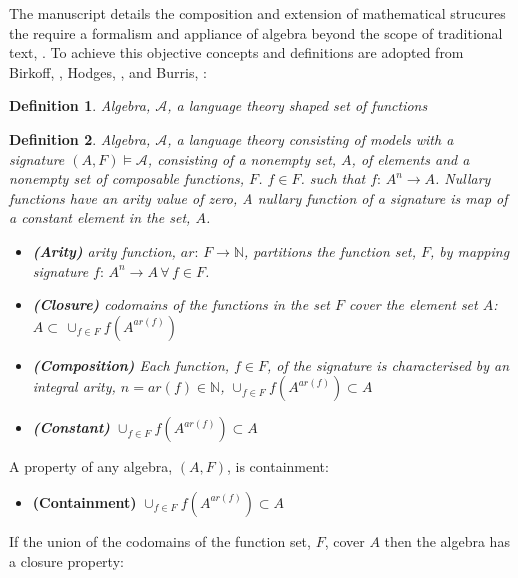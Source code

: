 \documentclass[aps,twocolumn,secnumarabic,nobalancelastpage,amsmath,amssymb,
amsthm,nofootinbib,parskip=full]{revtex4}
\newtheorem{definition}{Definition}[section]
\begin{document}
The manuscript details the composition and extension of
mathematical strucures the require a formalism and appliance
of algebra beyond the scope of traditional text, \cite{hungerford1974}.
To achieve this objective concepts and definitions are
adopted from Birkoff, \cite{birkoff1935}, Hodges, \cite{hodges1993},
and Burris, \cite{burris1981}:

\begin{definition}{Algebra, $\mathcal{A}$}\label{algebradef},
  a language theory shaped set of functions 
\end{definition}

\begin{definition}{Algebra, $\mathcal{A}$}\label{algebradef},
  a language theory consisting of models with
  a signature $(A,F)\models\mathcal{A}$,
  consisting of a nonempty set, $A$, of elements and a
  nonempty set of composable functions, $F$.
  $f\in F$. such that $f:\,A^{n}\rightarrow A$.
  Nullary functions have an arity value of zero,
  A nullary function of a signature is map of a
  constant element in the set, $A$.
\begin{itemize}
\item\textbf{\small (Arity)} arity
  function, $ar:\,F\rightarrow\mathbb{N}$,
  partitions the function
  set, $F$, by mapping signature
  $f:\,A^{n}\rightarrow A\,\forall\,f\in F$.
\item \textbf{\small (Closure)} codomains
  of the functions in the set $F$ cover
  the element set $A$: \\
  $A\subset\,\cup_{f\in F}f(A^{ar(f)})$
\item \textbf{\small (Composition)}
  Each function, $f\in F$, of the signature
  is characterised by
  an integral arity, $n=ar(f)\in\mathbb{N}$,
  $\cup_{f\in F}f(A^{ar(f)})\subset A$
\item \textbf{\small (Constant)}
  $\cup_{f\in F}f(A^{ar(f)})\subset A$
\end{itemize}
\end{definition}

A property of any algebra, $(A,F)$, is containment:

\begin{itemize}
\item \textbf{\small (Containment)}
  $\cup_{f\in F}f(A^{ar(f)})\subset A$
\end{itemize}

If the union of the codomains of the function set, $F$, cover $A$ then the algebra
has a closure property:
\end{document}

